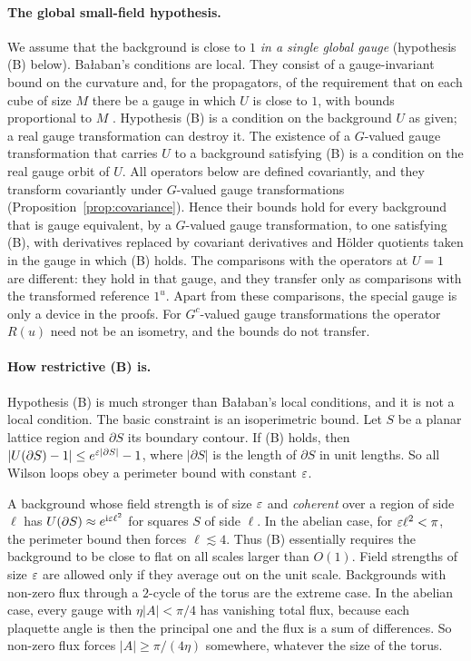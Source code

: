 \paragraph{The global small-field hypothesis.} We assume that the background is close to $1$ \emph{in a single global gauge} (hypothesis (B) below). Ba\l aban's conditions are local. They consist of a gauge-invariant bound on the curvature \cite[(2)]{BalVar} and, for the propagators, of the requirement that on each cube of size $M$ there be a gauge in which $U$ is close to $1$, with bounds proportional to $M$ \cite[(3.35)--(3.36)]{BalBackground}. Hypothesis (B) is a condition on the background $U$ as given; a real gauge transformation can destroy it. The existence of a $G$-valued gauge transformation that carries $U$ to a background satisfying (B) is a condition on the real gauge orbit of $U$. All operators below are defined covariantly, and they transform covariantly under $G$-valued gauge transformations (Proposition~\ref{prop:covariance}). Hence their bounds hold for every background that is gauge equivalent, by a $G$-valued gauge transformation, to one satisfying (B), with derivatives replaced by covariant derivatives and H\"older quotients taken in the gauge in which (B) holds. The comparisons with the operators at $U=1$ are different: they hold in that gauge, and they transfer only as comparisons with the transformed reference $1^u$. Apart from these comparisons, the special gauge is only a device in the proofs. For $G^c$-valued gauge transformations the operator $R(u)$ need not be an isometry, and the bounds do not transfer.

\paragraph{How restrictive (B) is.} Hypothesis (B) is much stronger than Ba\l aban's local conditions, and it is not a local condition. The basic constraint is an isoperimetric bound. Let $S$ be a planar lattice region and $\partial S$ its boundary contour. If (B) holds, then $|U(\partial S)-1|\le e^{\varepsilon|\partial S|}-1$, where $|\partial S|$ is the length of $\partial S$ in unit lengths. So all Wilson loops obey a perimeter bound with constant $\varepsilon$.

A background whose field strength is of size $\varepsilon$ and \emph{coherent} over a region of side $\ell$ has $U(\partial S)\approx e^{\mathrm i\varepsilon\ell^2}$ for squares $S$ of side $\ell$. In the abelian case, for $\varepsilon\ell^2<\pi$, the perimeter bound then forces $\ell\lesssim4$. Thus (B) essentially requires the background to be close to flat on all scales larger than $O(1)$. Field strengths of size $\varepsilon$ are allowed only if they average out on the unit scale. Backgrounds with non-zero flux through a $2$-cycle of the torus are the extreme case. In the abelian case, every gauge with $\eta|A|<\pi/4$ has vanishing total flux, because each plaquette angle is then the principal one and the flux is a sum of differences. So non-zero flux forces $|A|\ge\pi/(4\eta)$ somewhere, whatever the size of the torus.

